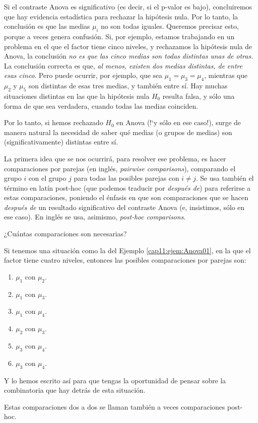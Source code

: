 Si el contraste Anova es significativo  (es decir, si el p-valor es bajo), concluiremos que hay evidencia estadística para rechazar la hipótesis nula. Por lo tanto, la conclusión es que las medias $\mu_i$ no son todas iguales.  Queremos precisar esto, porque a veces genera confusión. Si, por ejemplo, estamos trabajando en un problema en el que el factor tiene cinco niveles, y rechazamos la hipótesis nula de Anova, la conclusión {\em no es que las cinco medias son todas distintas unas de otras.} La conclusión correcta es que, {\em al menos, existen dos medias distintas, de entre esas cinco}. Pero puede ocurrir, por ejemplo, que sea $\mu_1=\mu_3=\mu_4$, mientras que $\mu_2$ y $\mu_5$ son distintas de esas tres medias, y también entre sí. Hay muchas situaciones distintas en las que la hipótesis nula $H_0$ resulta falsa, y sólo una forma de que sea verdadera, cuando todas las medias coinciden.

Por lo tanto, si hemos rechazado $H_0$ en Anova ({!`}y sólo en ese caso!), surge de manera natural la necesidad de saber qué medias (o grupos de medias) son (significativamente) distintas entre sí.

La primera idea que se nos ocurrirá, para resolver ese problema, es hacer {\sf comparaciones por parejas} (en inglés, {\em pairwise comparisons}), comparando el grupo $i$ con el grupo $j$ para todas las posibles parejas con $i\neq j$. Se usa también el término en latín {\sf post-hoc} (que podemos traducir por {\em después de}) para referirse a estas comparaciones, poniendo el énfasis en que son comparaciones que se hacen {\em después de} un resultado significativo del contraste Anova (e, insistimos, sólo en ese caso). En inglés se usa, asimismo, {\em post-hoc comparisons}.

¿Cuántas comparaciones son necesarias?
\begin{ejemplo}
\label{cap11:ejem:ComparacionesMultiples01}
Si tenemos una situación como la del Ejemplo \ref{cap11:ejem:Anova01}, en la que el factor tiene cuatro niveles, entonces las posibles comparaciones por parejas son:
\begin{enumerate}
  \item $\mu_1$ con $\mu_2$.
  \item $\mu_1$ con $\mu_3$.
  \item $\mu_1$ con $\mu_4$.
  \item $\mu_2$ con $\mu_3$.
  \item $\mu_3$ con $\mu_4$.
  \item $\mu_3$ con $\mu_4$.
\end{enumerate}
Y lo hemos escrito así para que tengas la oportunidad de pensar sobre la combinatoria que hay detrás de esta situación.
\end{ejemplo}
Estas comparaciones dos a dos se llaman también a veces {\sf comparaciones post-hoc}.

